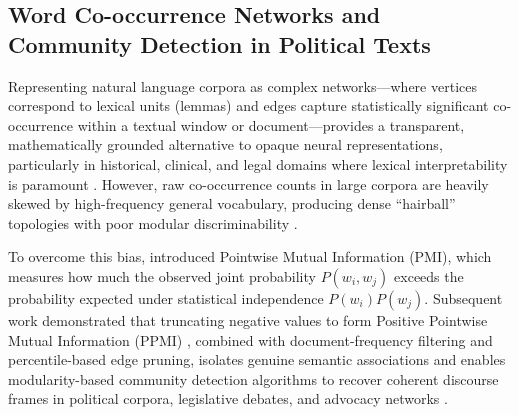 \documentclass[pdflatex,sn-basic]{sn-jnl}
\begin{document}
\subsection{Word Co-occurrence Networks and Community Detection in Political Texts}
Representing natural language corpora as complex networks---where vertices correspond to lexical units (lemmas) and edges capture statistically significant co-occurrence within a textual window or document---provides a transparent, mathematically grounded alternative to opaque neural representations, particularly in historical, clinical, and legal domains where lexical interpretability is paramount \citep{mota2012speech,amancio2015complex,quispe2021using,amancio2025leveraging}. However, raw co-occurrence counts in large corpora are heavily skewed by high-frequency general vocabulary, producing dense ``hairball'' topologies with poor modular discriminability \citep{turney2010frequency,quispe2021using}.

To overcome this bias, \citet{church1990word} introduced Pointwise Mutual Information (PMI), which measures how much the observed joint probability $P(w_i, w_j)$ exceeds the probability expected under statistical independence $P(w_i)P(w_j)$. Subsequent work demonstrated that truncating negative values to form Positive Pointwise Mutual Information (PPMI) \citep{bullinaria2007extracting,turney2010frequency}, combined with document-frequency filtering and percentile-based edge pruning, isolates genuine semantic associations and enables modularity-based community detection algorithms \citep{newman2006modularity,blondel2008fast,fortunato2010community,cordeiro2016dynamic,traag2019louvain} to recover coherent discourse frames in political corpora, legislative debates, and advocacy networks \citep{grimmer2013text,stieglitz2013social,rule2015lexical,bail2016combining}.
\end{document}
